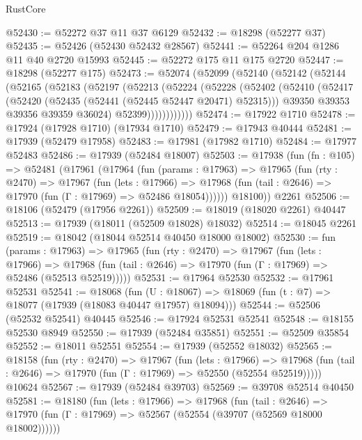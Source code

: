 \begin{lexlean}{RustCore}
\begin{coremodule}
@52430 := @52272 @37 @11 @37 @6129
@52432 := @18298 (@52277 @37)
@52435 := @52426 (@52430 @52432 @28567)
@52441 := @52264 @204 @1286 @11 @40 @2720 @15993
@52445 := @52272 @175 @11 @175 @2720
@52447 := @18298 (@52277 @175)
@52473 := @52074
    (@52099
      (@52140
        (@52142
          (@52144
            (@52165
              (@52183
                (@52197
                  (@52213
                    (@52224
                      (@52228
                        (@52402
                          (@52410
                            (@52417
                              (@52420 (@52435 (@52441 (@52445 @52447 @20471) @52315)))
                              @39350
                              @39353
                              @39356
                              @39359
                              @36024)
                            @52399))))))))))))
@52474 := @17922 @1710
@52478 := @17924 (@17928 @1710) (@17934 @1710)
@52479 := @17943 @40444
@52481 := @17939 (@52479 @17958)
@52483 := @17981 (@17982 @1710)
@52484 := @17977 @52483
@52486 := @17939 (@52484 @18007)
@52503 := @17938
    (fun (fn : @105) =>
    @52481
      (@17961
        (@17964
          (fun (params : @17963) =>
          @17965
            (fun (rty : @2470) =>
            @17967
              (fun (lets : @17966) =>
              @17968 (fun (tail : @2646) => @17970 (fun (Γ : @17969) => @52486 @18054))))))
        @18100))
    @2261
@52506 := @18106 (@52479 (@17956 @2261))
@52509 := @18019 (@18020 @2261) @40447
@52513 := @17939 (@18011 (@52509 @18028) @18032)
@52514 := @18045 @2261
@52519 := @18042 (@18044 @52514 @40450 @18000 @18002)
@52530 := fun (params : @17963) =>
  @17965
    (fun (rty : @2470) =>
    @17967
      (fun (lets : @17966) =>
      @17968 (fun (tail : @2646) => @17970 (fun (Γ : @17969) => @52486 (@52513 @52519)))))
@52531 := @17964 @52530
@52532 := @17961 @52531
@52541 := @18068
    (fun (U : @18067) => @18069 (fun (t : @7) => @18077 (@17939 (@18083 @40447 @17957) @18094)))
@52544 := @52506 (@52532 @52541) @40445
@52546 := @17924 @52531 @52541
@52548 := @18155 @52530 @8949
@52550 := @17939 (@52484 @35851)
@52551 := @52509 @35854
@52552 := @18011 @52551
@52554 := @17939 (@52552 @18032)
@52565 := @18158
    (fun (rty : @2470) =>
    @17967
      (fun (lets : @17966) =>
      @17968 (fun (tail : @2646) => @17970 (fun (Γ : @17969) => @52550 (@52554 @52519)))))
    @10624
@52567 := @17939 (@52484 @39703)
@52569 := @39708 @52514 @40450
@52581 := @18180
    (fun (lets : @17966) =>
    @17968
      (fun (tail : @2646) =>
      @17970 (fun (Γ : @17969) => @52567 (@52554 (@39707 (@52569 @18000 @18002))))))

\end{coremodule}
\end{lexlean}
